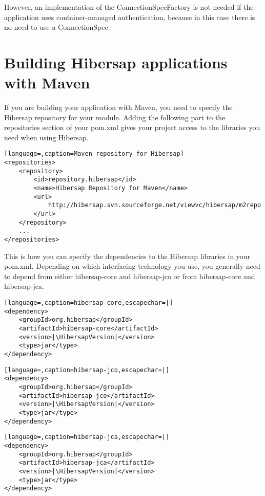 However, an implementation of the ConnectionSpecFactory is not needed if the application uses container-managed authentication, because in this case there is no need to use a ConnectionSpec.


\section{Building Hibersap applications with Maven}
\label{sec:Maven}

If you are building your application with Maven, you need to specify the Hibersap repository for your module.
Adding the following part to the repositories section of your pom.xml gives your project access to 
the libraries you need when using Hibersap.

\begin{lstlisting}[language=,caption=Maven repository for Hibersap]
<repositories>
    <repository>
        <id>repository.hibersap</id>
        <name>Hibersap Repository for Maven</name>
        <url>
            http://hibersap.svn.sourceforge.net/viewvc/hibersap/m2repo
        </url>
    </repository>
    ... 
</repositories>
\end{lstlisting}

This is how you can specify the dependencies to the Hibersap libraries in your pom.xml.
Depending on which interfacing technology you use, you generally need to depend from either
hibersap-core and hibersap-jco or from hibersap-core and hibersap-jca.

\begin{lstlisting}[language=,caption=hibersap-core,escapechar=|]
<dependency>
    <groupId>org.hibersap</groupId>
    <artifactId>hibersap-core</artifactId>
    <version>|\HibersapVersion|</version>
    <type>jar</type>
</dependency>
\end{lstlisting}

\begin{lstlisting}[language=,caption=hibersap-jco,escapechar=|]
<dependency>
    <groupId>org.hibersap</groupId>
    <artifactId>hibersap-jco</artifactId>
    <version>|\HibersapVersion|</version>
    <type>jar</type>
</dependency>
\end{lstlisting}

\begin{lstlisting}[language=,caption=hibersap-jca,escapechar=|]
<dependency>
    <groupId>org.hibersap</groupId>
    <artifactId>hibersap-jca</artifactId>
    <version>|\HibersapVersion|</version>
    <type>jar</type>
</dependency>
\end{lstlisting}


